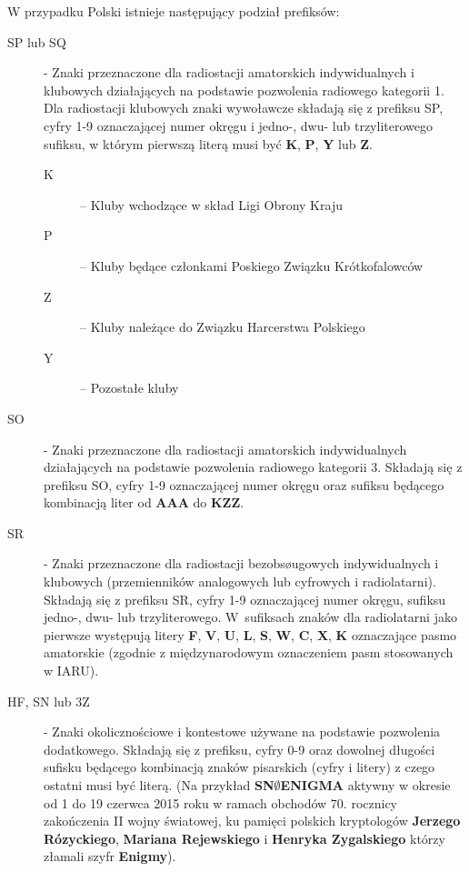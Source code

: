 \documentclass[]{mgr}
\begin{document}
            W przypadku Polski istnieje następujący podział prefiksów:
            \begin{description}
                \item[SP lub SQ] - Znaki przeznaczone dla radiostacji amatorskich indywidualnych i klubowych działających na podstawie pozwolenia radiowego kategorii 1. Dla radiostacji klubowych znaki wywoławcze składają się z prefiksu SP, cyfry 1-9 oznaczającej numer okręgu i jedno-, dwu- lub trzyliterowego sufiksu, w którym pierwszą literą musi być \textbf{K}, \textbf{P}, \textbf{Y} lub \textbf{Z}.

                \begin{description}
                    \item[K] -- Kluby wchodzące w skład Ligi Obrony Kraju
                    \item[P] -- Kluby będące członkami Poskiego Związku Krótkofalowców
                    \item[Z] -- Kluby należące do Związku Harcerstwa Polskiego
                    \item[Y] -- Pozostałe kluby
                \end{description}

                \item[SO] - Znaki przeznaczone dla radiostacji amatorskich indywidualnych działających na podstawie pozwolenia radiowego kategorii 3. Składają się z prefiksu SO, cyfry \mbox{1-9} oznaczającej numer okręgu oraz sufiksu będącego kombinacją liter od \textbf{AAA} do \textbf{KZZ}.
                \item[SR] - Znaki przeznaczone dla radiostacji bezobsøugowych indywidualnych i klubowych (przemienników analogowych lub cyfrowych i radiolatarni). Składają się z prefiksu SR, cyfry 1-9 oznaczającej numer okręgu, sufiksu jedno-, dwu- lub trzyliterowego. W~sufiksach znaków dla radiolatarni jako pierwsze występują litery \textbf{F}, \textbf{V}, \textbf{U}, \textbf{L}, \textbf{S}, \textbf{W}, \textbf{C}, \textbf{X}, \textbf{K} oznaczające pasmo amatorskie (zgodnie z międzynarodowym oznaczeniem pasm stosowanych w IARU).
                \item[HF, SN lub 3Z] - Znaki okolicznościowe i kontestowe używane na podstawie pozwolenia dodatkowego. Składają się z prefiksu, cyfry 0-9 oraz dowolnej długości sufisku będącego kombinacją znaków pisarskich (cyfry i litery) z czego ostatni musi być literą. (Na przykład \textbf{SN$\emptyset$ENIGMA} aktywny w okresie od 1 do 19 czerwca 2015 roku w ramach obchodów 70. rocznicy zakończenia II wojny światowej, ku pamięci polskich kryptologów \textbf{Jerzego Rózyckiego}, \textbf{Mariana Rejewskiego} i \textbf{Henryka Zygalskiego} którzy złamali szyfr \textbf{Enigmy}).
            \end{description}
\end{document}

